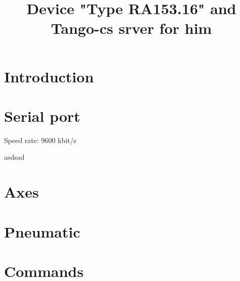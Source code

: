 \documentclass[prl, aps, showpacs, preprintnumbers, amsmath, amssymb, 
superscriptaddress]{revtex4-1}
\begin{document}
\title{Device "Type RA153.16" and Tango-cs srver for him}


\maketitle

\section{Introduction}
\section{Serial port}
Speed rate: 9600 kbit/s

asdsad
\section{Axes}
\section{Pneumatic}
\section{Commands}
\end{document}
